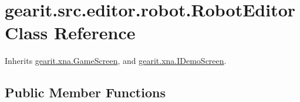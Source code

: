\hypertarget{classgearit_1_1src_1_1editor_1_1robot_1_1_robot_editor}{\section{gearit.\+src.\+editor.\+robot.\+Robot\+Editor Class Reference}
\label{classgearit_1_1src_1_1editor_1_1robot_1_1_robot_editor}
}


Inherits \hyperlink{classgearit_1_1xna_1_1_game_screen}{gearit.\+xna.\+Game\+Screen}, and \hyperlink{interfacegearit_1_1xna_1_1_i_demo_screen}{gearit.\+xna.\+I\+Demo\+Screen}.

\subsection*{Public Member Functions}
